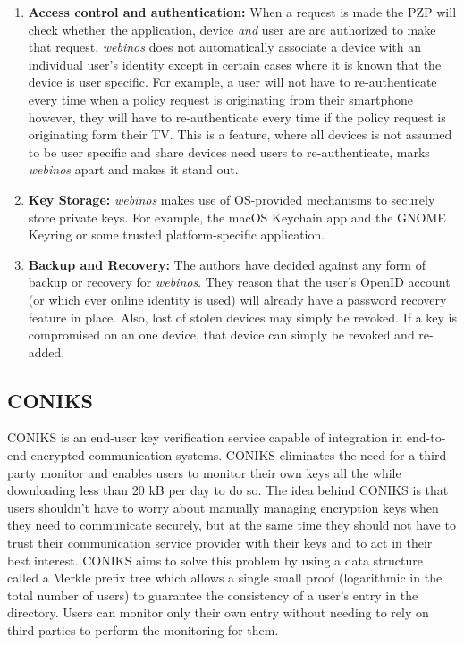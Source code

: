 \begin{enumerate}[label=\arabic*., wide, labelwidth=!, labelindent=0pt]
	\item \textbf{Access control and authentication:} When a request is made the PZP will check whether the application, device \textit{and} user 			are are authorized to make that request. \textit{webinos} does not automatically associate a device with an individual user's identity except in 			certain cases where it is known that the device is user specific. For example, a user will not have to re-authenticate every time when a policy 				request is originating from their smartphone however, they will have to re-authenticate every time if the policy request is originating form their 			TV. This is a feature, where all devices is not assumed to be user specific and share devices need users to re-authenticate, marks 								\textit{webinos} apart and makes it stand out. \\
	
	\item \textbf{Key Storage:} \textit{webinos} makes use of OS-provided mechanisms to securely store private keys. For example, the  							macOS Keychain app and the GNOME Keyring or some trusted platform-specific application. \\
	
	\item \textbf{Backup and Recovery:} The authors have decided against any form of backup or recovery for \textit{webinos}. They reason that 			the user's OpenID account (or which ever online identity is used) will already have a password recovery feature in place. Also, lost of stolen 					devices may simply be revoked. If a key is compromised on an one device, that device can simply be revoked and re-added.\\

\end{enumerate}

\subsection{CONIKS}

CONIKS is an end-user key verification service capable of integration in end-to-end encrypted communication systems\cite{Melara2015}. CONIKS eliminates the need for a third-party monitor and enables users to monitor their own keys all the while downloading less than 20 kB per day to do so. The idea behind CONIKS is that users shouldn't have to worry about manually managing encryption keys when they need to communicate securely, but at the same time they should not have to trust their communication service provider with their keys and to act in their best interest. CONIKS aims to solve this problem by using a data structure called a Merkle prefix tree which allows a single small proof (logarithmic in the total number of users) to guarantee the consistency of a user's entry in the directory. Users can monitor only their own entry without needing to rely on third parties to perform the monitoring for them.

